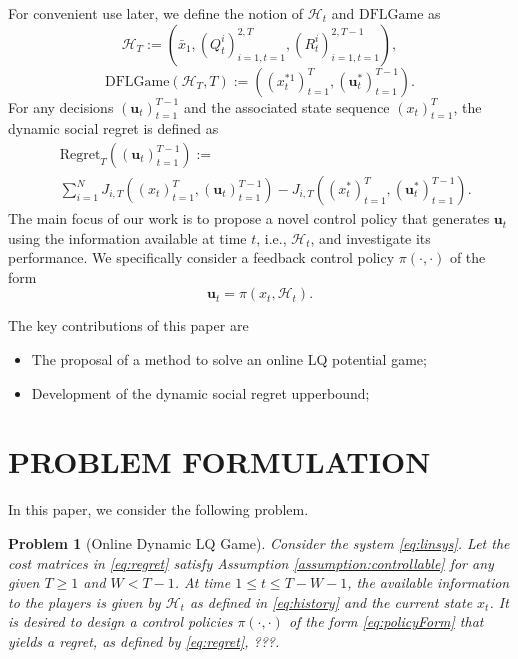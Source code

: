 \documentclass[letterpaper, 10 pt, conference]{ieeeconf}  %
\newtheorem{problem}{Problem}
\begin{document}
For convenient use later, we define the notion of $\mathcal{H}_{t}$ and $\text{DFLGame}$ as
\begin{equation}\label{eq:history}
    \mathcal{H}_{T} := ( \bar{x}_{1},(Q_{t}^{i})_{i=1,t=1}^{2,T},(R_{t}^{i})_{i=1,t=1}^{2,T-1}),
\end{equation}
\begin{equation}\label{eq:regret}
 \text{DFLGame}(\mathcal{H}_{T},T):=((x_{t}^{*1})_{t=1}^{T}, (\mathbf{u}_{t}^{*})_{t=1}^{T-1}).
\end{equation}
For any decisions $(\mathbf{u}_{t})_{t=1}^{T-1}$ and the associated state sequence $(x_{t})_{t=1}^{T}$, the dynamic social regret is defined as
\begin{equation}
    \begin{split}
        &\text{Regret}_{T}((\mathbf{u}_{t})_{t=1}^{T-1}) := \\
        &\sum_{i=1}^{N} J_{i,T}((x_{t})_{t=1}^{T},(\mathbf{u}_{t})_{t=1}^{T-1}) - J_{i,T}((x_{t}^{*})_{t=1}^{T},(\mathbf{u}_{t}^{*})_{t=1}^{T-1}).
    \end{split}
\end{equation}
The main focus of our work is to propose a novel control policy that generates $\mathbf{u}_{t}$ using the information available at time $t$, i.e., $\mathcal{H}_{t}$, and investigate its performance. We specifically consider a feedback control policy $\pi(\cdot,\cdot)$ of the form 
\begin{equation}\label{eq:policyForm}
    \mathbf{u}_{t} = \pi(x_{t}, \mathcal{H}_{t}).
\end{equation}

The key contributions of this paper are
\begin{itemize}
    \item The proposal of a method to solve an online LQ potential game;
    \item Development of the dynamic social regret upperbound;
\end{itemize}



\section{PROBLEM FORMULATION}
In this paper, we consider the following problem.
\begin{problem}[Online Dynamic LQ Game]
     Consider the system \eqref{eq:linsys}. Let the cost matrices in \eqref{eq:regret} satisfy Assumption \ref{assumption:controllable} for any given $T \geq 1$ and $W < T-1$. At time $1 \leq t \leq T-W-1$, the available information to the players is given by $\mathcal{H}_{t}$ as defined in \eqref{eq:history} and the current state $x_{t}$. It is desired to design a control policies $\pi(\cdot, \cdot)$ of the form \eqref{eq:policyForm} that yields a regret, as defined by \eqref{eq:regret}, ???.
\end{problem}
\end{document}
